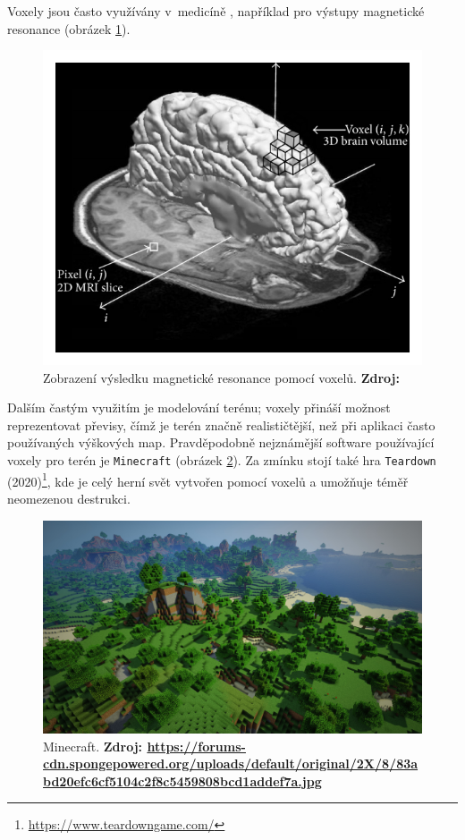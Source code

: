 Voxely jsou často využívány v~medicíně \cite{medical_vox}, například pro výstupy magnetické resonance (obrázek \ref{fig:mri_vox}).

\begin{figure}[H]
	\centering
	\includegraphics[scale=1]{obrazky-figures/voxel_mri.png}
	\caption{Zobrazení výsledku magnetické resonance pomocí voxelů. \textbf{Zdroj: \cite{mri}}}
	\label{fig:mri_vox}
\end{figure}

Dalším častým využitím je modelování terénu; voxely přináší možnost reprezentovat převisy, čímž je terén značně realističtější, než při aplikaci často používaných výškových map. Pravděpodobně nejznámější software používající voxely pro terén je \texttt{Minecraft} (obrázek \ref{fig:minecraft}). Za zmínku stojí také hra \texttt{Teardown} (2020)\footnote{\url{https://www.teardowngame.com/}}, kde je celý herní svět vytvořen pomocí voxelů a umožňuje téměř neomezenou destrukci.

\begin{figure}[H]
	\centering
	\includegraphics[scale=0.15]{obrazky-figures/minecraft.jpg}
	\caption{Minecraft. \textbf{Zdroj: \url{https://forums-cdn.spongepowered.org/uploads/default/original/2X/8/83abd20efc6cf5104c2f8c5459808bcd1addef7a.jpg}}}
	\label{fig:minecraft}
\end{figure}

